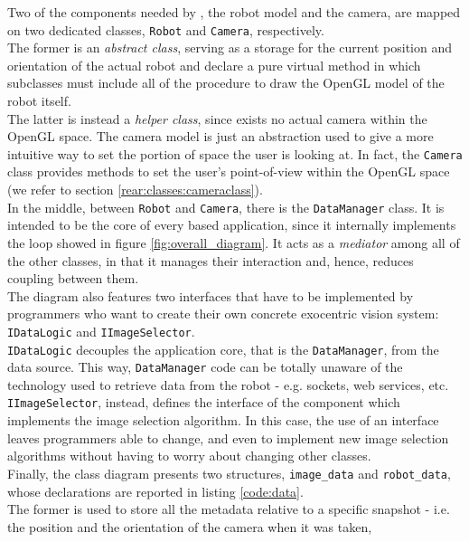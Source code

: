 Two of the components needed by \framework{}, the robot 
model and the camera, are mapped on two dedicated classes, 
\texttt{Robot} and \texttt{Camera}, respectively.
\\
The former is an \textit{abstract class}, serving as a storage 
for the current position and orientation of the actual
robot and declare a pure virtual method in which subclasses 
must include all of the procedure to draw the OpenGL model 
of the robot itself.
\\
The latter is instead a \textit{helper class}, since 
exists no actual camera within the OpenGL space. The camera 
model is just an abstraction used to give a more intuitive
way to set the portion of space the user is looking at.
In fact, the \texttt{Camera} class provides methods to 
set the user's point-of-view within the OpenGL space (we
refer to section \ref{rear:classes:cameraclass}).
\\
In the middle, between \texttt{Robot} and \texttt{Camera},
there is the \texttt{DataManager} class. It is intended to be 
the core of every \framework{} based application, since it 
internally implements the loop showed in figure 
\ref{fig:overall_diagram}.
It acts as a \textit{mediator} among all of the other classes, 
in that it manages their interaction and, hence, reduces 
coupling between them.
\\
The diagram also features two interfaces that have to be implemented 
by programmers who want to create their own concrete exocentric 
vision system: \texttt{IDataLogic} and 
\texttt{IImageSelector}.
\\
\texttt{IDataLogic} decouples the application 
core, that is the \texttt{DataManager}, from the data source.
This way, \texttt{DataManager} code can be totally unaware of 
the technology used to retrieve data from the robot - e.g. 
sockets, web services, etc.
\\
\texttt{IImageSelector}, instead, defines the interface 
of the component which implements the image selection algorithm.
In this case, the use of an interface leaves programmers 
able to change, and even to implement new image 
selection algorithms without having to worry about
changing other classes.
\\
Finally, the class diagram presents two structures, 
\texttt{image\_data} and \texttt{robot\_data}, whose 
declarations are reported in listing \ref{code:data}.
\\
The former is used to store all the metadata 
relative to a specific snapshot - i.e. the position 
and the orientation of the camera when it was taken, 
